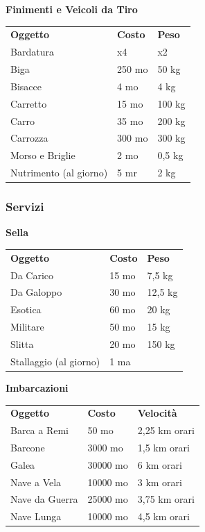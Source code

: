 \begin{multicols}{2}
\medskip

\textbf{Finimenti e Veicoli da Tiro}\label{Veicoli}\hypertarget{Veicoli}{}

\begin{tabularx}{0.48\textwidth}{llX}
\toprule
\textbf{Oggetto}&\textbf{Costo}&\textbf{Peso}\\
Bardatura&x4&x2\\
Biga&250 mo&50 kg\\
Bisacce&4 mo&4 kg\\
Carretto&15 mo&100 kg\\
Carro&35 mo&200 kg\\
Carrozza&300 mo&300 kg\\
Morso e Briglie&2 mo&0,5 kg\\
Nutrimento (al giorno)&5 mr&2 kg
\end{tabularx}



\subsubsection{Servizi}

\textbf{Sella}

\begin{tabularx}{0.48\textwidth}{llX}
\toprule
\textbf{Oggetto}&\textbf{Costo}&\textbf{Peso}\\
Da Carico&15 mo&7,5 kg\\
Da Galoppo&30 mo&12,5 kg\\
Esotica&60 mo&20 kg\\
Militare&50 mo&15 kg\\
Slitta&20 mo&150 kg\\
Stallaggio (al giorno)&1 ma&
\end{tabularx}

\medskip

\textbf{Imbarcazioni}\hypertarget{Imbarcazioni}{}

\begin{tabularx}{0.48\textwidth}{llX}
\toprule
\textbf{Oggetto}&\textbf{Costo}&\textbf{Velocità}\\
Barca a Remi&50 mo&2,25 km orari\\
Barcone&3000 mo&1,5 km orari\\
Galea&30000 mo&6 km orari\\
Nave a Vela&10000 mo&3 km orari\\
Nave da Guerra&25000 mo&3,75 km orari\\
Nave Lunga&10000 mo&4,5 km orari
\end{tabularx}


\end{multicols}
